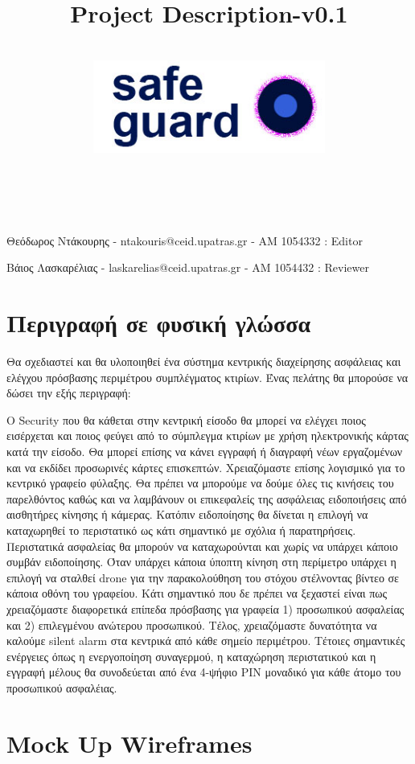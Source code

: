 \documentclass{article}
\title{Project Description-v0.1}
\author{\\
\includegraphics[width=3in]{safeguard}\\[1ex]\\\\
}
\begin{document}
\maketitle

\newpage


Θεόδωρος Ντάκουρης - ntakouris@ceid.upatras.gr - ΑΜ 1054332 : Editor 


Βάιος Λασκαρέλιας - laskarelias@ceid.upatras.gr - ΑΜ 1054432 : Reviewer


\renewcommand{\contentsname}{Περιεχόμενα}
\tableofcontents

\section{Περιγραφή σε φυσική γλώσσα}
Θα σχεδιαστεί και θα υλοποιηθεί ένα σύστημα κεντρικής διαχείρησης ασφάλειας και ελέγχου πρόσβασης περιμέτρου συμπλέγματος κτιρίων. Ένας πελάτης θα μπορούσε να δώσει την εξής περιγραφή:


Ο Security που θα κάθεται στην κεντρική είσοδο θα μπορεί να ελέγχει ποιος εισέρχεται και ποιος φεύγει από το σύμπλεγμα κτιρίων
με χρήση ηλεκτρονικής κάρτας κατά την είσοδο. Θα μπορεί επίσης να κάνει εγγραφή ή διαγραφή νέων εργαζομένων και να εκδίδει προσωρινές κάρτες επισκεπτών. Χρειαζόμαστε επίσης λογισμικό για το κεντρικό γραφείο φύλαξης. Θα πρέπει να μπορούμε να δούμε όλες τις κινήσεις του παρελθόντος καθώς και να λαμβάνουν οι επικεφαλείς της ασφάλειας ειδοποιήσεις από αισθητήρες κίνησης ή κάμερας. Κατόπιν ειδοποίησης θα δίνεται η επιλογή να καταχωρηθεί το περιστατικό ως κάτι σημαντικό με σχόλια ή παρατηρήσεις. Περιστατικά ασφαλείας θα μπορούν να καταχωρούνται και χωρίς να υπάρχει κάποιο συμβάν ειδοποίησης. Όταν υπάρχει κάποια ύποπτη κίνηση στη περίμετρο υπάρχει η επιλογή να σταλθεί drone για την παρακολούθηση του στόχου στέλνοντας βίντεο σε κάποια οθόνη του γραφείου. Κάτι σημαντικό που δε πρέπει να ξεχαστεί είναι πως χρειαζόμαστε διαφορετικά επίπεδα πρόσβασης για γραφεία 1) προσωπικού ασφαλείας και 2) επιλεγμένου ανώτερου προσωπικού. Τέλος, χρειαζόμαστε δυνατότητα να καλούμε silent alarm στα κεντρικά από κάθε σημείο περιμέτρου. Τέτοιες σημαντικές ενέργειες όπως η ενεργοποίηση συναγερμού, η καταχώρηση περιστατικού και η εγγραφή μέλους θα συνοδεύεται από ένα 4-ψήφιο PIN μοναδικό για κάθε άτομο του προσωπικού ασφαλέιας.

\section{Mock Up Wireframes}
\end{document}
